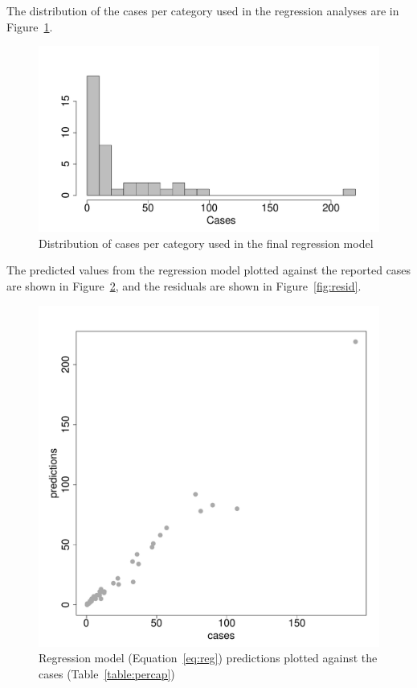 \documentclass{article}
\begin{document}
The distribution of the cases per category used in the regression analyses are in Figure~\ref{fig:histcasecat}.
\begin{figure}[h!]
\begin{center}
\includegraphics{draftfinalreport-032}
\end{center}
\caption{Distribution of cases per category used in the final regression model}
\label{fig:histcasecat}
\end{figure}

The predicted values from the regression model plotted against the reported cases are shown in Figure~\ref{fig:predict}, and the residuals are shown in Figure~\ref{fig:resid}.
\begin{figure}[h!]
\begin{center}
\includegraphics{draftfinalreport-033}
\end{center}
\caption{Regression model (Equation~\ref{eq:reg}) predictions plotted against the cases (Table~\ref{table:percap})}
\label{fig:predict}
\end{figure}
\end{document}
